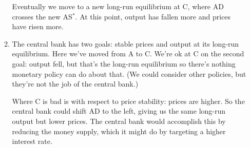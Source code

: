 \begin{enumerate}
\begin{enumerate}
\begin{center}
\begin{figure*}[t]
\begin{picture}
\end{picture}
\end{figure*}
\end{center}


Eventually we move to a new long-run equilibrium at C,
where AD crosses the new AS$^*$.
At this point, output has fallen more and prices have risen more.

\item The central bank  has two goals:  stable prices and output
at its long-run equilibrium.
Here we've moved from A to C.
We're ok at C on the second goal:  output fell,
but that's the long-run equilibrium so there's nothing monetary policy
can do about that.
(We could consider other policies, but they're not the job of the central bank.)

Where C is bad is with respect to price stability:  prices are higher.
So the central bank  could shift AD to the left, giving us the same
long-run output but lower prices.
The central bank  would accomplish this by reducing the money supply,
which it might do by targeting a higher interest rate.
\end{enumerate}



\end{enumerate}
